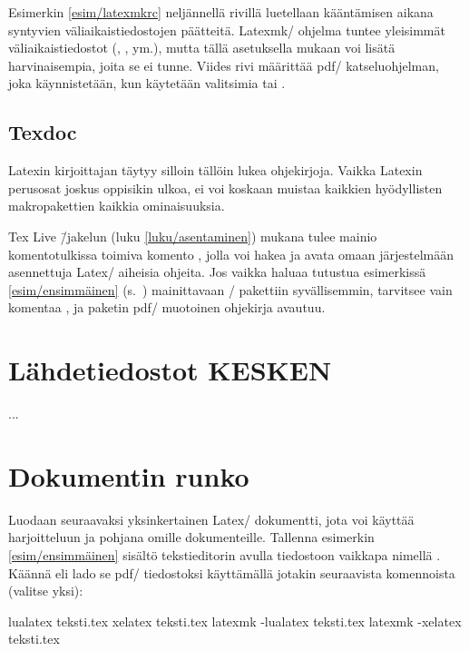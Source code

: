 Esimerkin \ref{esim/latexmkrc} neljännellä rivillä luetellaan
kääntämisen aikana syntyvien väliaikaistiedostojen päätteitä. Latexmk\-/
ohjelma tuntee yleisimmät väliaikaistiedostot (, ,
 ym.), mutta tällä asetuksella mukaan voi lisätä
harvinaisempia, joita se ei tunne. Viides rivi määrittää pdf\-/
katseluohjelman, joka käynnistetään, kun käytetään valitsimia
 tai .

\subsection{Texdoc}

Latexin kirjoittajan täytyy silloin tällöin lukea ohjekirjoja. Vaikka
Latexin perusosat joskus oppisikin ulkoa, ei voi koskaan muistaa
kaikkien hyödyllisten makropakettien kaikkia ominaisuuksia.

Tex Live \=/jakelun (luku \ref{luku/asentaminen}) mukana tulee mainio
komentotulkissa toimiva komento , jolla voi hakea ja avata
omaan järjestelmään asennettuja Latex\-/ aiheisia ohjeita. Jos vaikka
haluaa tutustua esimerkissä \ref{esim/ensimmäinen}
(s.~\pageref{esim/ensimmäinen}) mainittavaan \-/
pakettiin syvällisemmin, tarvitsee vain komentaa , ja paketin pdf\-/ muotoinen ohjekirja avautuu.

\section{Lähdetiedostot KESKEN}

...


\section{Dokumentin runko}

Luodaan seuraavaksi yksinkertainen Latex\-/ dokumentti, jota voi käyttää
harjoitteluun ja pohjana omille dokumenteille. Tallenna esimerkin
\ref{esim/ensimmäinen} sisältö tekstieditorin avulla tiedostoon vaikkapa
nimellä . Käännä eli lado se pdf\-/ tiedostoksi
käyttämällä jotakin seuraavista komennoista (valitse yksi):

\begin{koodilohkosis}
lualatex teksti.tex
xelatex  teksti.tex
latexmk -lualatex teksti.tex
latexmk -xelatex  teksti.tex
\end{koodilohkosis}

